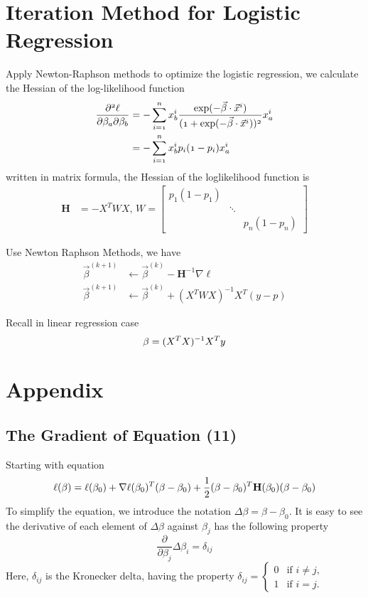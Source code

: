 \documentclass[12pt, oneside]{article}
\begin{document}
\section{Iteration Method for Logistic Regression}
Apply Newton-Raphson methods to optimize the logistic regression, we calculate the Hessian of the log-likelihood function
\begin{align*}
\mathnormal{\frac{\partial^2\ell}{\partial\beta_a\partial\beta_b}}
&=\mathnormal{-\sum_{i=1}^{n}x_b^i\frac{\exp(-\vec{\beta}\cdot\vec{x}^i)}{(1+\exp(-\vec{\beta}\cdot\vec{x}^i))^2}x_a^i}\\
&=\mathnormal{-\sum_{i=1}^{n}x_b^i p_i (1-p_i)x_a^i}\\
\end{align*}
written in matrix formula, the Hessian of the loglikelihood function is
\begin{align*}
\mathbf{H}&={-X^TWX}\text{, } 
{W}=  \begin{bmatrix}
    {p_1 (1-p_1)} & & \\
    & \ddots & \\
    & & {p_n (1-p_n)}
  \end{bmatrix}
\end{align*}

Use Newton Raphson Methods, we have
\begin{align*}
{\vec{\beta}^{(k+1)}} &\leftarrow {\vec{\beta}^{(k)}-{\mathbf{H}}^{-1}\nabla\ell}\\
{\vec{\beta}^{(k+1)}} &\leftarrow {\vec{\beta}^{(k)}+({X}^T{W}{X})^{-1}{X}^T({y}-{p})}
\end{align*}

Recall in linear regression case
$$
\beta=(\mathnormal{X^T}\mathnormal{X})^{-1}\mathnormal{X^{T}}\mathnormal{y}
$$



\section{Appendix}
\subsection{The Gradient of Equation (11)}
Starting with equation 
\begin{equation}
\ell({\beta})=\ell( {\beta_0} )+\nabla\ell(\beta_0)^T({\beta}-{\beta_0})+\frac{1}{2}(\beta-\beta_0)^T\mathbf{H}(\beta_0)(\beta-\beta_0)\\
\end{equation}
To simplify the equation, we introduce the notation $\Delta\beta=\beta-\beta_0$. It is easy to see the derivative of each element of 
$\Delta\beta$ against $\beta_j$ has the following property 
\begin{equation}
\frac{\partial}{\partial\beta_j}\Delta\beta_i=\delta_{ij}
\end{equation}
Here, $\delta_{ij}$ is the Kronecker delta, having the property $\delta _{{ij}}={\begin{cases}0&{\text{if }}i\neq j,\\1&{\text{if }}i=j.\end{cases}}$
\end{document}
